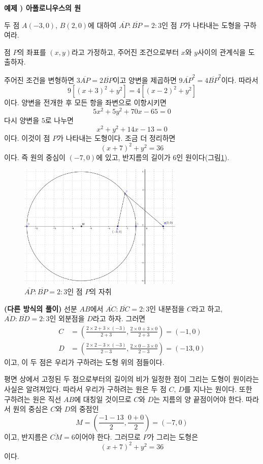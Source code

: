 \documentclass{article}
\newcounter{num}
\newcommand{\exam}[1]
{\bigskip\noindent\refstepcounter{num}\textbf{예제 \arabic{num}) #1}\par}
\newcommand{\sol}{\par\bigskip\noindent{\bfseries풀이)}\par}
\begin{document}
%
\exam{아폴로니우스의 원}
두 점 \(A(-3,0)\), \(B(2,0)\)에 대하여 \(\overline{AP}:\overline{BP}=2:3\)인 점 \(P\)가 나타내는 도형을 구하여라.

\sol
점 \(P\)의 좌표를 \((x,y)\)라고 가정하고, 주어진 조건으로부터 \(x\)와 \(y\)사이의  관계식을 도출하자.

주어진 조건을 변형하면 \(3\overline{AP}=2\overline{BP}\)이고 양변을 제곱하면 \(9\overline{AP}^2=4\overline{BP}^2\)이다.
따라서
\[9[(x+3)^2+y^2]=4[(x-2)^2+y^2]\]
이다.
양변을 전개한 후 모든 항을 좌변으로 이항시키면
\[5x^2+5y^2+70x-65=0\]
다시 양변을 \(5\)로 나누면
\[x^2+y^2+14x-13=0\]
이다.
이것이 점 \(P\)가 나타내는 도형이다.
조금 더 정리하면
\[(x+7)^2+y^2=36\]
이다.
즉 원의 중심이 \((-7,0)\)에 있고, 반지름의 길이가 \(6\)인 원이다(그림\ref{appolonius}).

\begin{figure}[h!]
\center
\includegraphics[width=0.7\textwidth]{appolonius}
\caption{\(\overline{AP}:\overline{BP}=2:3\)인 점 \(P\)의 자취}
\label{appolonius}
\end{figure}

\textbf{(다른 방식의 풀이)}
선분 \(AB\)에서 \(\overline{AC}:\overline{BC}=2:3\)인 내분점을 \(C\)라고 하고, \(\overline{AD}:\overline{BD}=2:3\)인 외분점을 \(D\)라고 하자.
그러면
\begin{align*}
C&=\left(\frac{2\times2+3\times(-3)}{2+3},\frac{2\times0+3\times0}{2+3}\right)=\left(-1,0\right)\\
D&=\left(\frac{2\times2-3\times(-3)}{2-3},\frac{2\times0-3\times0}{2-3}\right)=\left(-13,0\right)
\end{align*}
이고, 이 두 점은 우리가 구하려는 도형 위의 점들이다.

평면 상에서 고정된 두 점으로부터의 길이의 비가 일정한 점이 그리는 도형이 원이라는 사실은 알려져있다.
따라서 우리가 구하려는 원은 두 점 \(C\), \(D\)를 지나는 원이다.
또한 구하려는 원은 직선 \(AB\)에 대칭일 것이므로 \(C\)와 \(D\)는 지름의 양 끝점이어야 한다.
따라서 원의 중심은 \(C\)와 \(D\)의 중점인
\[M=\left(\frac{-1-13}2,\frac{0+0}2\right)=(-7,0)\]
이고, 반지름은 \(\overline{CM}=6\)이어야 한다.
그러므로 \(P\)가 그리는 도형은
\[(x+7)^2+y^2=36\]
이다.
\end{document}
